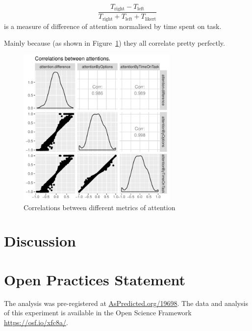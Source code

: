 \documentclass[12pt]{article}
\begin{document}
\begin{equation}
	\frac{T_\text{right}-T_\text{left}}{T_\text{right}+T_\text{left}+T_\text{likert}}
\end{equation}
is a measure of difference of attention normalised by time spent on task. 



Mainly because (as shown in Figure~\ref{figure:attentionCorrelations}) they all correlate pretty perfectly. 

\begin{figure}
	\centering
	\includegraphics[width=0.7\textwidth]{images/attentionCorrelations}
	\caption{Correlations between different metrics of attention}
	\label{figure:attentionCorrelations}
\end{figure}

\section{Discussion}

\section{Open Practices Statement}
The analysis was pre-registered at \url{AsPredicted.org/19698}. The data and analysis of this experiment is available in the Open Science Framework \url{https://osf.io/xfc8a/}. 


\newpage


\end{document}
